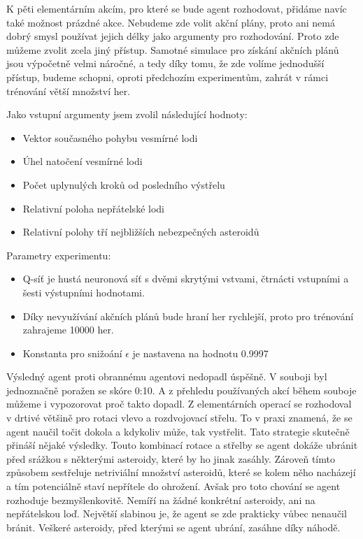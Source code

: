 \par
K pěti elementárním akcím, pro které se bude agent rozhodovat, přidáme navíc také možnost prázdné akce. 
Nebudeme zde volit akční plány, proto ani nemá dobrý smysl používat jejich délky jako argumenty pro rozhodování. Proto zde můžeme zvolit zcela jiný přístup.
Samotné simulace pro získání akčních plánů jsou výpočetně velmi náročné, a tedy díky tomu, že zde volíme jednodušší přístup, budeme schopni, oproti předchozím experimentům, zahrát v rámci trénování větší množství her.

\par
Jako vstupní argumenty jsem zvolil následující hodnoty:
\begin{itemize}
    \item Vektor současného pohybu vesmírné lodi
    \item Úhel natočení vesmírné lodi
    \item Počet uplynulých kroků od posledního výstřelu
    \item Relativní poloha nepřátelské lodi
    \item Relativní polohy tří nejbližších nebezpečných asteroidů
\end{itemize}

Parametry experimentu:
\begin{itemize}
    \item Q-síť je hustá neuronová síť s dvěmi skrytými vstvami, čtrnácti vstupními a šesti výstupními hodnotami.
    \item Díky nevyužívání akčních plánů bude hraní her rychlejší, proto pro trénování zahrajeme 10000 her.
    \item Konstanta pro snižoání $\epsilon$ je nastavena na hodnotu 0.9997
\end{itemize}


Výsledný agent proti obrannému agentovi nedopadl úspěšně. V souboji byl jednoznačně poražen se skóre 0:10.
A z přehledu používaných akcí během souboje můžeme i vypozorovat proč takto dopadl. Z elementárních operací se rozhodoval v drtivé většině pro rotaci vlevo a rozdvojovací střelu.
To v praxi znamená, že se agent naučil točit dokola a kdykoliv může, tak vystřelit. Tato strategie skutečně přináší nějaké výsledky.
Touto kombinací rotace a střelby se agent dokáže ubránit před srážkou s některými asteroidy, které by ho jinak zasáhly. Zároveň tímto způsobem sestřeluje netriviální množství asteroidů, které se kolem něho nacházejí a tím potenciálně staví nepřítele do ohrožení.
Avšak pro toto chování se agent rozhoduje bezmyšlenkovitě. 
Nemíří na žádné konkrétní asteroidy, ani na nepřátelskou loď.
Největší slabinou je, že agent se zde prakticky vůbec nenaučil bránit.
Veškeré asteroidy, před kterými se agent ubrání, zasáhne díky náhodě.


